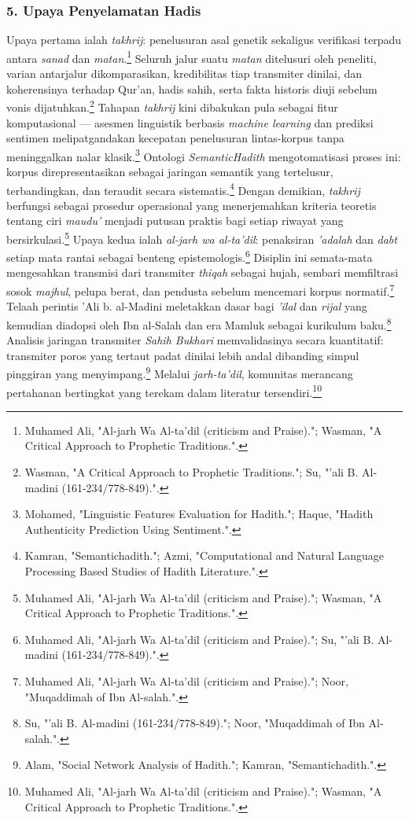 \subsubsection*{5. Upaya Penyelamatan Hadis}

Upaya pertama ialah \textit{takhrij}: penelusuran asal genetik sekaligus verifikasi terpadu antara \textit{sanad} dan \textit{matan}.\footnote{Muhamed Ali, "Al-jarh Wa Al-ta'dil (criticism and Praise)."; Wasman, "A Critical Approach to Prophetic Traditions.".} Seluruh jalur suatu \textit{matan} ditelusuri oleh peneliti, varian antarjalur dikomparasikan, kredibilitas tiap transmiter dinilai, dan koherensinya terhadap Qur'an, hadis sahih, serta fakta historis diuji sebelum vonis dijatuhkan.\footnote{Wasman, "A Critical Approach to Prophetic Traditions."; Su, "'ali B. Al-madini (161-234/778-849).".} Tahapan \textit{takhrij} kini dibakukan pula sebagai fitur komputasional --- asesmen linguistik berbasis \textit{machine learning} dan prediksi sentimen melipatgandakan kecepatan penelusuran lintas-korpus tanpa meninggalkan nalar klasik.\footnote{Mohamed, "Linguistic Features Evaluation for Hadith."; Haque, "Hadith Authenticity Prediction Using Sentiment.".} Ontologi \textit{SemanticHadith} mengotomatisasi proses ini: korpus direpresentasikan sebagai jaringan semantik yang tertelusur, terbandingkan, dan teraudit secara sistematis.\footnote{Kamran, "Semantichadith."; Azmi, "Computational and Natural Language Processing Based Studies of Hadith Literature.".} Dengan demikian, \textit{takhrij} berfungsi sebagai prosedur operasional yang menerjemahkan kriteria teoretis tentang ciri \textit{maudu'} menjadi putusan praktis bagi setiap riwayat yang bersirkulasi.\footnote{Muhamed Ali, "Al-jarh Wa Al-ta'dil (criticism and Praise)."; Wasman, "A Critical Approach to Prophetic Traditions.".} Upaya kedua ialah \textit{al-jarh wa al-ta'dil}: penaksiran \textit{'adalah} dan \textit{dabt} setiap mata rantai sebagai benteng epistemologis.\footnote{Muhamed Ali, "Al-jarh Wa Al-ta'dil (criticism and Praise)."; Su, "'ali B. Al-madini (161-234/778-849).".} Disiplin ini semata-mata mengesahkan transmisi dari transmiter \textit{thiqah} sebagai hujah, sembari memfiltrasi sosok \textit{majhul}, pelupa berat, dan pendusta sebelum mencemari korpus normatif.\footnote{Muhamed Ali, "Al-jarh Wa Al-ta'dil (criticism and Praise)."; Noor, "Muqaddimah of Ibn Al-salah.".} Telaah perintis 'Ali b. al-Madini meletakkan dasar bagi \textit{'ilal} dan \textit{rijal} yang kemudian diadopsi oleh Ibn al-Salah dan era Mamluk sebagai kurikulum baku.\footnote{Su, "'ali B. Al-madini (161-234/778-849)."; Noor, "Muqaddimah of Ibn Al-salah.".} Analisis jaringan transmiter \textit{Sahih Bukhari} memvalidasinya secara kuantitatif: transmiter poros yang tertaut padat dinilai lebih andal dibanding simpul pinggiran yang menyimpang.\footnote{Alam, "Social Network Analysis of Hadith."; Kamran, "Semantichadith.".} Melalui \textit{jarh-ta'dil}, komunitas merancang pertahanan bertingkat yang terekam dalam literatur tersendiri.\footnote{Muhamed Ali, "Al-jarh Wa Al-ta'dil (criticism and Praise)."; Wasman, "A Critical Approach to Prophetic Traditions.".}

